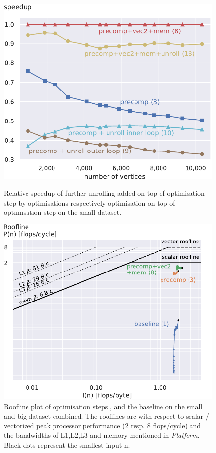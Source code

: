 \documentclass[letterpaper]{article}
\let\cref=\Cref %
\begin{document}
\begin{figure}[!t]
\begin{minipage}[t]{\oldlinewidth}\centering
	\includegraphics[width=\linewidth]{img/speedup[3][8][9][10][13]_small.pdf}
	\caption{Relative speedup of further unrolling added on top of optimisation step  by optimisations  respectively optimisation  on top of optimisation step  on the small dataset. \label{speedupUnsuccessful}}
\end{minipage}%
\hfil
\begin{minipage}[t]{\oldlinewidth}\centering
	\includegraphics[width=\linewidth]{img/roofline[1][3][8]_both.pdf}
	\caption{Roofline plot of optimisation steps ,  and the baseline  on the small and big dataset combined.
			The rooflines are with respect to scalar / vectorized peak processor performance (2 resp. 8 flops/cycle) and the bandwidths of L1,L2,L3 and memory mentioned in \cref{sec:setup} \emph{Platform}. Black dots represent the smallest input n. \label{rooflineEndToEndSmall}}
\end{minipage}%
\end{figure}
\end{document}

